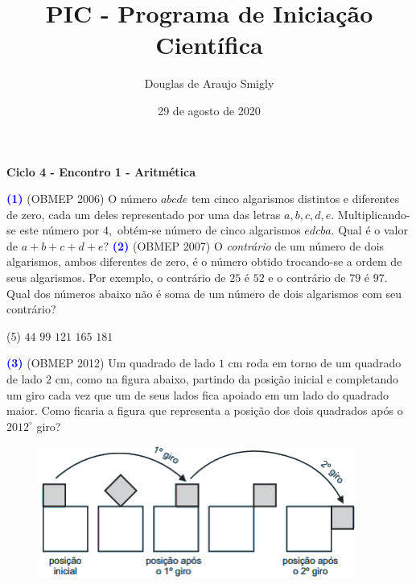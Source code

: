 \documentclass[12pt, a4paper]{article}
\title{PIC - Programa de Iniciação Científica}
\author{Douglas de Araujo Smigly}
\date{29 de agosto de 2020}
\newcommand{\negrito}[1]{\mbox{\boldmath{$#1$}}}
\begin{document}
\maketitle
\begin{center}
\large\textbf{\textcolor{Floresta}{Ciclo 4 - Encontro 1 - Aritmética}}\\
\end{center}
\textcolor{blue}{\bf(1)} (OBMEP 2006) O número $abcde$ tem cinco algarismos distintos e diferentes de zero, cada um deles
representado por uma das letras $a, b, c, d, e.$ Multiplicando-se este número por $4,$
obtém-se número de cinco algarismos $edcba.$ Qual é o valor de $a + b + c + d + e?$
\newline\newline
\textcolor{blue}{\bf(2)} (OBMEP 2007) O \textit{contrário }de um número de dois algarismos, ambos diferentes de zero, é o número
obtido trocando-se a ordem de seus algarismos. Por exemplo, o contrário de $25$ é $52$ e o contrário de $79$ é $97.$ Qual dos números abaixo não é soma de um número de dois algarismos com seu contrário?
\begin{tasks}[counter-format={(tsk[a])},label-width=3.6ex, label-format = {\bfseries}, column-sep = {0pt}](5)
\task[\textcolor{Floresta}{$\negrito{(a)} $}] $44$
\task[\textcolor{Floresta}{$\negrito{(b)} $}] $99$
\task[\textcolor{Floresta}{$\negrito{(c)} $}] $121$
\task[\textcolor{Floresta}{$\negrito{(d)} $}] $165$
\task[\textcolor{Floresta}{$\negrito{(e)} $}] $181$
\end{tasks} 
\textcolor{blue}{\bf(3)} (OBMEP 2012) Um quadrado de lado $1$ cm roda em torno de um quadrado de lado $2$ cm, como na
figura abaixo, partindo da posição inicial e completando um giro cada vez que um de seus lados fica apoiado em um lado do quadrado maior. Como ficaria a figura que representa a posição dos dois quadrados após o $2012^\circ$ giro?
\begin{figure}[!h]
    \centering
    \includegraphics{Figuras/q3c4e1.png}
\end{figure}
\end{document}
